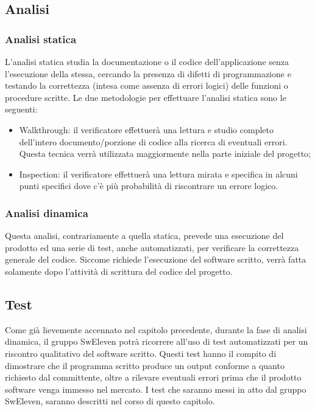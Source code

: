 \subsection{Analisi}
\subsubsection{Analisi statica}
L’analisi statica studia la documentazione o il codice dell’applicazione senza l’esecuzione della stessa, cercando la presenza di difetti di programmazione e testando la correttezza (intesa come assenza di errori logici) delle funzioni o procedure scritte.
Le due metodologie per effettuare l’analisi statica sono le seguenti:
\begin{itemize}
	\item Walkthrough: il verificatore effettuerà una lettura e studio completo dell’intero documento/porzione di codice alla ricerca di eventuali errori. Questa tecnica verrà utilizzata maggiormente nella parte iniziale del progetto;
	\item Inspection: il verificatore effettuerà una lettura mirata e specifica in alcuni punti specifici dove c’è più probabilità di riscontrare un errore logico.
\end{itemize}

\subsubsection{Analisi dinamica}
Questa analisi, contrariamente a quella statica, prevede una esecuzione del prodotto ed una serie di test, anche automatizzati, per verificare la correttezza generale del codice. Siccome richiede l’esecuzione del software scritto, verrà fatta solamente dopo l’attività di scrittura del codice del progetto.

\subsection{Test}
Come già lievemente accennato nel capitolo precedente, durante la fase di analisi dinamica, il gruppo SwEleven potrà ricorrere all’uso di test automatizzati per un riscontro qualitativo del software scritto. Questi test hanno il compito di dimostrare che il programma scritto produce un output conforme a quanto richiesto dal committente, oltre a rilevare eventuali errori prima che il prodotto software venga immesso nel mercato. I test che saranno messi in atto dal gruppo SwEleven, saranno descritti nel corso di questo capitolo.


